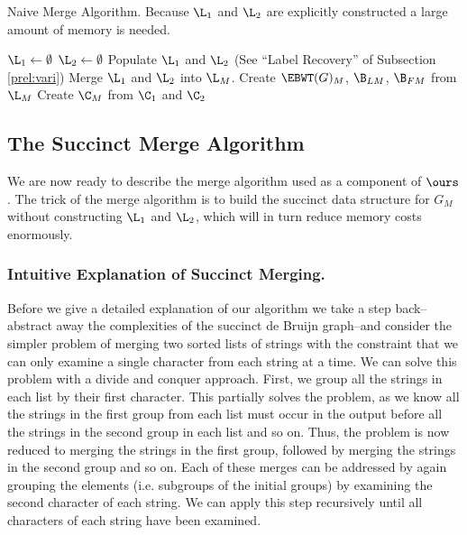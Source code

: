 \renewcommand{\algorithmiccomment}[1]{\hskip0em$\triangleright$ #1}

\begin{algorithm}[h!]
\caption{Naive Merge Algorithm.  Because $\L_1$ and $\L_2$ are explicitly constructed a large amount of memory is needed.}
\label{alg:naive_alg}
  \begin{algorithmic}
    \State $\L_1 \leftarrow \emptyset$
    \State $\L_2 \leftarrow \emptyset$
  	\State Populate $\L_1$ and $\L_2$ (See ``Label Recovery'' of Subsection \ref{prel:vari})
	\State Merge $\L_1$ and $\L_2$ into $\L_M$.
	\State Create  $\EBWT(G)_M$, $\B_{LM}$, $\B_{FM}$ from $\L_M$
    \State Create $\C_M$ from $\C_1$ and $\C_2$
	\end{algorithmic}
\end{algorithm}





\subsection*{The Succinct Merge Algorithm}

We are now ready to describe the merge algorithm used as a component of $\ours$.  The trick of the merge algorithm is to build the succinct data structure for $G_M$  without constructing $\L_1$ and $\L_2$, which will in turn reduce memory costs enormously.   


\subsubsection*{Intuitive Explanation of Succinct Merging.} Before we give a detailed explanation of our algorithm we take a step back--abstract away the complexities of the succinct de Bruijn graph--and consider the simpler problem of merging two sorted lists of strings with the constraint that we can only examine a single character from each string at a time.  We can solve this problem with a divide and conquer approach.  First, we group all the strings in each list by their first character.  This partially solves the problem, as we know all the strings in the first group from each list must occur in the output before all the strings in the second group in each list and so on.  Thus, the problem is now reduced to merging the strings in the first group, followed by merging the strings in the second group and so on.  Each of these merges can be addressed by again grouping the elements (i.e. subgroups of the initial groups) by examining the second character of each string.  We can apply this step recursively until all characters of each string have been examined.  

